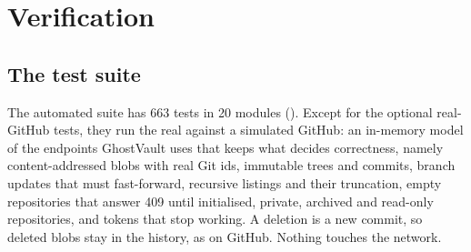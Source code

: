 \section{Verification}\label{sec:verification}

\subsection{The test suite}
The automated suite has 663 tests in 20 modules (). Except for the optional
real-GitHub tests, they run the real  against a simulated GitHub: an in-memory model of
the endpoints GhostVault uses that keeps what decides correctness, namely content-addressed blobs with
real Git ids, immutable trees and commits, branch updates that must fast-forward, recursive listings
and their truncation, empty repositories that answer 409 until initialised, private, archived and
read-only repositories, and tokens that stop working. A deletion is a new commit, so deleted blobs
stay in the history, as on GitHub. Nothing touches the network.

